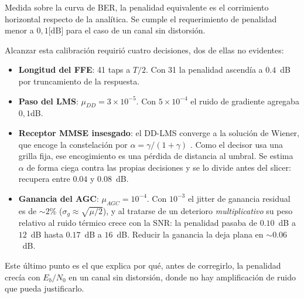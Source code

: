 Medida sobre la curva de BER, la penalidad equivalente es el corrimiento
horizontal respecto de la analítica. Se cumple el requerimiento de penalidad menor a $0,1\text{[dB]}$ para el caso de un canal sin distorsión.
 
Alcanzar esta calibración requirió cuatro decisiones, dos de ellas no
evidentes:
 
\begin{itemize}\itemsep2pt
\item \textbf{Longitud del FFE}: 41 taps a $T/2$. Con 31 la penalidad
      ascendía a $0.4$~dB por truncamiento de la respuesta.
\item \textbf{Paso del LMS}: $\mu_{DD} = 3\times10^{-5}$. Con $5\times10^{-4}$ el
      ruido de gradiente agregaba $0,1$dB.
\item \textbf{Receptor MMSE insesgado}: el DD-LMS converge a la solución de
      Wiener, que encoge la constelación por $\alpha = \gamma/(1+\gamma)$ \cite{cioffi1995mmse}. Como el decisor usa una
      grilla fija, ese encogimiento es una pérdida de distancia al
      umbral. Se estima $\alpha$ de forma ciega contra las propias decisiones
      y se lo divide antes del slicer: recupera entre $0.04$ y $0.08$~dB.
\item \textbf{Ganancia del AGC}: $\mu_{AGC} = 10^{-4}$. Con $10^{-3}$ el
      jitter de ganancia residual es de $\sim 2\%$
      ($\sigma_g \approx \sqrt{\mu/2}$), y al tratarse de un deterioro
      \emph{multiplicativo} su peso relativo al ruido térmico crece con la
      SNR: la penalidad pasaba de $0.10$~dB a $12$~dB hasta $0.17$~dB a
      $16$~dB. Reducir la ganancia la deja plana en $\sim 0.06$~dB.
\end{itemize}
 
Este último punto es el que explica por qué, antes de corregirlo, la
penalidad crecía con $E_b/N_0$ en un canal sin distorsión, donde no hay
amplificación de ruido que pueda justificarlo.
 
